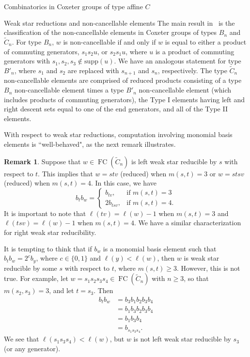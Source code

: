 \documentclass[11pt]{amsart}
\theoremstyle{definition}
\newtheorem{remark}[theorem]{Remark}
\numberwithin{equation}{section}
\newcommand{\C}{\widetilde{C}}
\newcommand{\supp}{\mathrm{supp}}
\renewcommand{\(}{\left(}
\renewcommand{\)}{\right)}
\DeclareMathOperator{\FC}{FC}
\begin{document}
\begin{section}{Combinatorics in Coxeter groups of type affine $C$}
\begin{subsection}{Weak star reductions and non-cancellable elements}
The main result in~\cite{Ernst2010} is the classification of the non-cancellable elements in Coxeter groups of types $B_n$ and $\C_n$.  For type $B_n$, $w$ is non-cancellable if and only if $w$ is equal to either a product of commuting generators, $s_{1}s_{2}u$, or $s_{2}s_{1}u$, where $u$ is a product of commuting generators with $s_{1}, s_{2}, s_{3} \notin \supp(u)$.  We have an analogous statement for type $B'_n$, where $s_{1}$ and $s_{2}$ are replaced with $s_{n+1}$ and $s_{n}$, respectively.  The type $\C_n$ non-cancellable elements are comprised of reduced products consisting of a type $B_n$ non-cancellable element times a type $B'_n$ non-cancellable element (which includes products of commuting generators), the Type I elements having left and right descent sets equal to one of the end generators, and all of the Type II elements. 

With respect to weak star reductions, computation involving monomial basis elements is ``well-behaved", as the next remark illustrates.

\begin{remark}\label{rem:monomial weak star reductions}
Suppose that $w \in \FC(\C_{n})$ is left weak star reducible by $s$ with respect to $t$.  This implies that $w=stv$ (reduced) when $m(s,t)=3$ or $w=stsv$ (reduced) when $m(s,t)=4$.  In this case, we have
\[
b_{t}b_{w}=\begin{cases}
b_{tv},   & \text{if } m(s,t)=3\\
2b_{tsv},   & \text{if } m(s,t)=4.
\end{cases}
\]
It is important to note that $\ell(tv)=\ell(w)-1$ when $m(s,t)=3$ and $\ell(tsv)=\ell(w)-1$ when $m(s,t)=4$.  We have a similar characterization for right weak star reducibility.  
\end{remark}

It is tempting to think that if $b_{w}$ is a monomial basis element such that $b_{t}b_{w}=2^{c}b_{y}$, where $c\in \{0,1\}$ and $\ell(y)<\ell(w)$, then $w$ is weak star reducible by some $s$ with respect to $t$, where $m(s,t)\geq 3$.  However, this is not true.  For example, let $w=s_{1}s_{2}s_{3}s_{4} \in \FC(\C_{n})$ with $n \geq 3$, so that $m(s_{2},s_{3})=3$, and let $t=s_{3}$.  Then
{\allowdisplaybreaks
\begin{align*}
b_{t}b_{w} &= b_{3}b_{1}b_{2}b_{3}b_{4} \\
&= b_{1}b_{3}b_{2}b_{3}b_{4}\\
&= b_{1}b_{3}b_{4} \\
&= b_{s_{1}s_{3}s_{4}}.
\end{align*}}%
We see that $\ell(s_{1}s_{3}s_{4}) < \ell(w)$, but $w$ is not left weak star reducible by $s_{3}$ (or any generator).  


\end{subsection}
\end{section}
\end{document}
